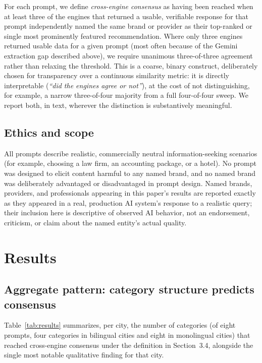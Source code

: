 \documentclass[11pt]{article}
\begin{document}
For each prompt, we define \emph{cross-engine consensus} as having been reached when at
least three of the engines that returned a usable, verifiable response for that prompt
independently named the same brand or provider as their top-ranked or single most
prominently featured recommendation. Where only three engines returned usable data for
a given prompt (most often because of the Gemini extraction gap described above), we
require unanimous three-of-three agreement rather than relaxing the threshold. This is
a coarse, binary construct, deliberately chosen for transparency over a continuous
similarity metric: it is directly interpretable (\textit{``did the engines agree or
not''}), at the cost of not distinguishing, for example, a narrow three-of-four
majority from a full four-of-four sweep. We report both, in text, wherever the
distinction is substantively meaningful.

\subsection{Ethics and scope}

All prompts describe realistic, commercially neutral information-seeking scenarios (for
example, choosing a law firm, an accounting package, or a hotel). No prompt was
designed to elicit content harmful to any named brand, and no named brand was
deliberately advantaged or disadvantaged in prompt design. Named brands, providers, and
professionals appearing in this paper's results are reported exactly as they appeared in
a real, production AI system's response to a realistic query; their inclusion here is
descriptive of observed AI behavior, not an endorsement, criticism, or claim about the
named entity's actual quality.

\section{Results}

\subsection{Aggregate pattern: category structure predicts consensus}

Table~\ref{tab:results} summarizes, per city, the number of categories (of eight
prompts, four categories in bilingual cities and eight in monolingual cities) that
reached cross-engine consensus under the definition in Section~3.4, alongside the
single most notable qualitative finding for that city.
\end{document}
